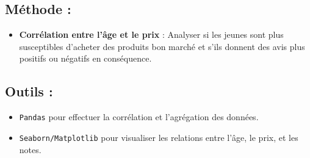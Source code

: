 \documentclass{article}
\begin{document}
	\subsection{Méthode :}
	\begin{itemize}
		\item \textbf{Corrélation entre l'âge et le prix} : Analyser si les jeunes sont plus susceptibles d'acheter des produits bon marché et s’ils donnent des avis plus positifs ou négatifs en conséquence.
	\end{itemize}
	
	\subsection{Outils :}
	\begin{itemize}
		\item \texttt{Pandas} pour effectuer la corrélation et l'agrégation des données.
		\item \texttt{Seaborn/Matplotlib} pour visualiser les relations entre l’âge, le prix, et les notes.
	\end{itemize}
	
\end{document}
